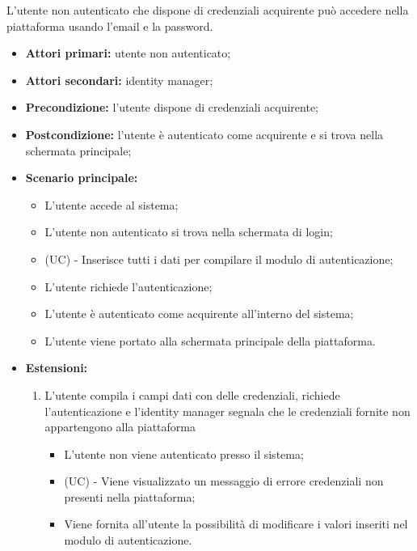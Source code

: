 L'utente non autenticato che dispone di credenziali acquirente può accedere nella piattaforma usando l'email e la password.
\begin{itemize}
	\item \textbf{Attori primari:} utente non autenticato;
	\item \textbf{Attori secondari:} identity manager;
	\item \textbf{Precondizione:} l'utente dispone di credenziali acquirente;
	\item \textbf{Postcondizione:} l'utente è autenticato come acquirente e si trova nella schermata principale;
	\item \textbf{Scenario principale:}
	\begin{itemize}
		\item L'utente accede al sistema;
		\item L'utente non autenticato si trova nella schermata di login;
		\item (UC) - Inserisce tutti i dati per compilare il modulo di autenticazione; %
		\item L'utente richiede l'autenticazione;
		\item L'utente è autenticato come acquirente all'interno del sistema;
		\item L'utente viene portato alla schermata principale della piattaforma.
	\end{itemize}
	\item \textbf{Estensioni:}
	\begin{enumerate}[label=\lett]
		\item L'utente compila i campi dati con delle credenziali, richiede l'autenticazione e l'identity manager segnala che le credenziali fornite non appartengono alla piattaforma
		\begin{itemize}
			\item L'utente non viene autenticato presso il sistema;
			\item (UC) - Viene visualizzato un messaggio di errore credenziali non presenti nella piattaforma;
			\item Viene fornita all'utente la possibilità di modificare i valori inseriti nel modulo di autenticazione.
		\end{itemize}
	\end{enumerate} 
\end{itemize}


